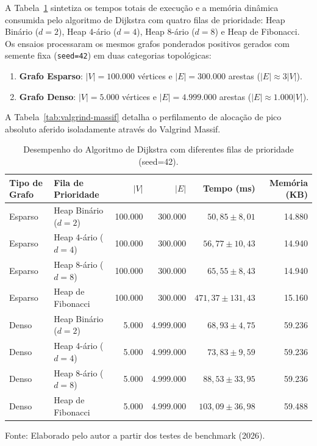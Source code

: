 \documentclass[12pt,a4paper]{report}
\begin{document}
A Tabela~\ref{tab:estudo2-cenario2} sintetiza os tempos totais de execução e a memória dinâmica consumida pelo algoritmo de Dijkstra com quatro filas de prioridade: Heap Binário ($d=2$), Heap 4-ário ($d=4$), Heap 8-ário ($d=8$) e Heap de Fibonacci. Os ensaios processaram os mesmos grafos ponderados positivos gerados com semente fixa (\texttt{seed=42}) em duas categorias topológicas:
\begin{enumerate}
  \item \textbf{Grafo Esparso}: $|V| = 100.000$ vértices e $|E| = 300.000$ arestas ($|E| \approx 3|V|$).
  \item \textbf{Grafo Denso}: $|V| = 5.000$ vértices e $|E| = 4.999.000$ arestas ($|E| \approx 1.000|V|$).
\end{enumerate}

A Tabela~\ref{tab:valgrind-massif} detalha o perfilamento de alocação de pico absoluto aferido isoladamente através do Valgrind Massif.

\begin{table}[htbp]
  \centering
  \caption{Desempenho do Algoritmo de Dijkstra com diferentes filas de prioridade (seed=42).}
  \label{tab:estudo2-cenario2}
  \footnotesize
  \setlength{\tabcolsep}{4.5pt}
  \begin{tabular}{llrrrr}
    \toprule
    \textbf{Tipo de Grafo} & \textbf{Fila de Prioridade} & \textbf{$|V|$} & \textbf{$|E|$} & \textbf{Tempo (ms)} & \textbf{Memória (KB)} \\
    \midrule
    Esparso & Heap Binário ($d=2$) & 100.000 & 300.000 & $50{,}85 \pm 8{,}01$ & 14.880 \\
    Esparso & Heap 4-ário ($d=4$) & 100.000 & 300.000 & $56{,}77 \pm 10{,}43$ & 14.940 \\
    Esparso & Heap 8-ário ($d=8$) & 100.000 & 300.000 & $65{,}55 \pm 8{,}43$ & 14.940 \\
    Esparso & Heap de Fibonacci & 100.000 & 300.000 & $471{,}37 \pm 131{,}43$ & 15.160 \\
    \midrule
    Denso & Heap Binário ($d=2$) & 5.000 & 4.999.000 & $68{,}93 \pm 4{,}75$ & 59.236 \\
    Denso & Heap 4-ário ($d=4$) & 5.000 & 4.999.000 & $73{,}83 \pm 9{,}59$ & 59.236 \\
    Denso & Heap 8-ário ($d=8$) & 5.000 & 4.999.000 & $88{,}53 \pm 33{,}95$ & 59.236 \\
    Denso & Heap de Fibonacci & 5.000 & 4.999.000 & $103{,}09 \pm 36{,}98$ & 59.488 \\
    \bottomrule
  \end{tabular}
  \vspace{0.2cm}
  
  \raggedright\footnotesize Fonte: Elaborado pelo autor a partir dos testes de benchmark (2026).
\end{table}
\end{document}
